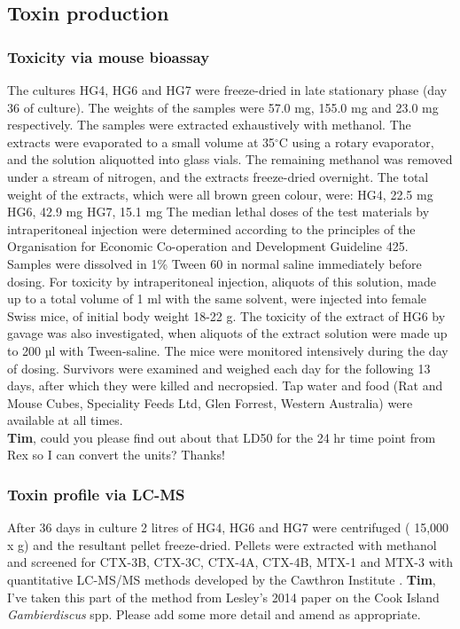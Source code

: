 \documentclass[12pt]{article}
\begin{document}
\subsection{Toxin production}

\subsubsection{Toxicity via mouse bioassay}
The cultures HG4, HG6 and HG7 were freeze-dried in late stationary phase (day 36 of culture). The weights of the samples were 57.0 mg, 155.0 mg and 23.0 mg respectively. The samples were extracted exhaustively with methanol. The extracts were evaporated to a small volume at 35$^{\circ}$C using a rotary evaporator, and the solution aliquotted into glass vials. The remaining methanol was removed under a stream of nitrogen, and the extracts freeze-dried overnight. The total weight of the extracts, which were all brown green colour, were: HG4, 22.5 mg HG6, 42.9 mg HG7, 15.1 mg The median lethal doses of the test materials by intraperitoneal injection were determined according to the principles of the Organisation for Economic Co-operation and Development Guideline 425. Samples were dissolved in 1\% Tween 60 in normal saline immediately before dosing. For toxicity by intraperitoneal injection, aliquots of this solution, made up to a total volume of 1 ml with the same solvent, were injected into female Swiss mice, of initial body weight 18-22 g. The toxicity of the extract of HG6 by gavage was also investigated, when aliquots of the extract solution were made up to 200 µl with Tween-saline. The mice were monitored intensively during the day of dosing. Survivors were examined and weighed each day for the following 13 days, after which they were killed and necropsied. Tap water and food (Rat and Mouse Cubes, Speciality Feeds Ltd, Glen Forrest, Western Australia) were available at all times.\\
\textbf{Tim}, could you please find out about that LD50 for the 24 hr time point from Rex so I can convert the units? Thanks!

\subsubsection{Toxin profile via LC-MS}
After 36 days in culture 2 litres of HG4, HG6 and HG7 were centrifuged ( 15,000 x g) and the resultant pellet freeze-dried. Pellets were extracted with methanol and screened for CTX-3B, CTX-3C, CTX-4A, CTX-4B, MTX-1 and MTX-3 with quantitative LC-MS/MS methods developed by the Cawthron Institute \citep{kohli2014feeding}.
\textbf{Tim}, I've taken this part of the method from Lesley's 2014 paper on the Cook Island \emph{Gambierdiscus} spp. Please add some more detail and amend as appropriate. 
\end{document}
